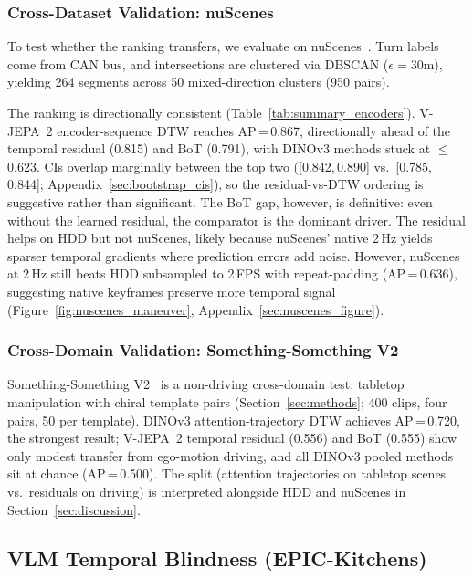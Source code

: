 \documentclass{article}
\theoremstyle{remark}
\begin{document}
\subsubsection{Cross-Dataset Validation: nuScenes}
\label{sec:nuscenes}

To test whether the ranking transfers, we evaluate on nuScenes~\cite{nuscenes}. Turn labels come from CAN bus, and intersections are clustered via DBSCAN ($\epsilon\!=\!30$m), yielding 264 segments across 50 mixed-direction clusters (950 pairs).

The ranking is directionally consistent (Table~\ref{tab:summary_encoders}). V-JEPA~2 encoder-sequence DTW reaches AP\,=\,0.867, directionally ahead of the temporal residual (0.815) and BoT (0.791), with DINOv3 methods stuck at $\leq$0.623. CIs overlap marginally between the top two ([0.842,\,0.890] vs.\ [0.785,\,0.844]; Appendix~\ref{sec:bootstrap_cis}), so the residual-vs-DTW ordering is suggestive rather than significant. The BoT gap, however, is definitive: even without the learned residual, the comparator is the dominant driver. The residual helps on HDD but not nuScenes, likely because nuScenes' native 2\,Hz yields sparser temporal gradients where prediction errors add noise. However, nuScenes at 2\,Hz still beats HDD subsampled to 2\,FPS with repeat-padding (AP\,=\,0.636), suggesting native keyframes preserve more temporal signal (Figure~\ref{fig:nuscenes_maneuver}, Appendix~\ref{sec:nuscenes_figure}).

\subsubsection{Cross-Domain Validation: Something-Something V2}
\label{sec:ssv2}

Something-Something V2~\cite{ssv2} is a non-driving cross-domain test: tabletop manipulation with chiral template pairs (Section~\ref{sec:methods}; 400 clips, four pairs, 50 per template). DINOv3 attention-trajectory DTW achieves AP\,=\,0.720, the strongest result; V-JEPA~2 temporal residual (0.556) and BoT (0.555) show only modest transfer from ego-motion driving, and all DINOv3 pooled methods sit at chance (AP\,=\,0.500). The split (attention trajectories on tabletop scenes vs.\ residuals on driving) is interpreted alongside HDD and nuScenes in Section~\ref{sec:discussion}.

\subsection{VLM Temporal Blindness (EPIC-Kitchens)}
\end{document}
